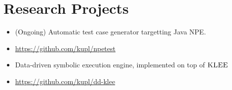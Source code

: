 
\section{Research Projects}

{
\begin{itemize}
\item (Ongoing) Automatic test case generator targetting Java NPE.
\item \url{https://github.com/kupl/npetest}
\end{itemize}
}

\vspace{2mm}


{
\begin{itemize}
\item Data-driven symbolic execution engine, implemented on top of $\textsc{KLEE}$
\item \url{https://github.com/kupl/dd-klee}
\end{itemize}
}

\vspace{9mm}

